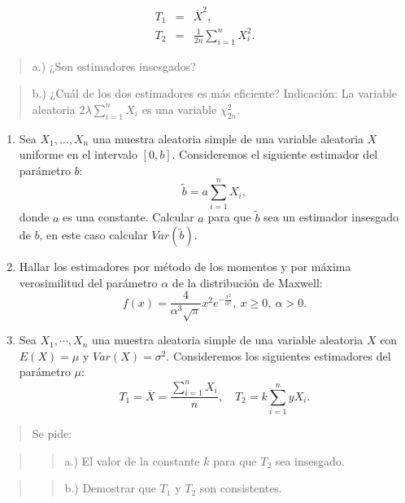 \documentclass[]{article}
\begin{document}
\begin{eqnarray*}
T_1 & = & \overline{X}^2,\\
T_2 & = & \frac{1}{2n}\sum\limits_{i=1}^n X_i^2.
\end{eqnarray*}

\begin{quote}
a.) ¿Son estimadores insesgados?
\end{quote}

\begin{quote}
b.) ¿Cuál de los dos estimadores es más eficiente? Indicación: La
variable aleatoria \(2\lambda \sum\limits_{i=1}^n X_i\) es una variable
\(\chi_{2n}^2\).
\end{quote}

\begin{enumerate}
\def\labelenumi{\arabic{enumi}.}
\setcounter{enumi}{17}
\item
  Sea \(X_1,\ldots,X_n\) una muestra aleatoria simple de una variable
  aleatoria \(X\) uniforme en el intervalo \([0,b]\). Consideremos el
  siguiente estimador del parámetro \(b\): \[
  \tilde{b}=a\sum\limits_{i=1}^n X_i,
  \] donde \(a\) es una constante. Calcular \(a\) para que \(\tilde{b}\)
  sea un estimador insesgado de \(b\), en este caso calcular
  \(Var(\tilde{b})\).
\item
  Hallar los estimadores por método de los momentos y por máxima
  verosimilitud del parámetro \(\alpha\) de la distribución de Maxwell:
  \[
  f(x)=\frac{4}{\alpha^3 \sqrt{\pi}} x^2 
  e^{-\frac{x^2}{\alpha^2}},\ x\geq 0,\ \alpha >0.
  \]
\item
  Sea \(X_1,\cdots,X_n\) una muestra aleatoria simple de una variable
  aleatoria \(X\) con \(E(X)=\mu\) y \(Var(X)=\sigma^2\). Consideremos
  los siguientes estimadores del parámetro \(\mu\): \[
  T_1 = \overline{X}=\frac{\sum\limits_{i=1}^n X_i}{n},\quad
  T_2 = k \sum_{i=1}^n y  X_i.
  \]
\end{enumerate}

\begin{quote}
Se pide:
\end{quote}

\begin{quote}
\begin{quote}
a.) El valor de la constante \(k\) para que \(T_2\) sea insesgado.
\end{quote}
\end{quote}

\begin{quote}
\begin{quote}
b.) Demostrar que \(T_1\) y \(T_2\) son consistentes.
\end{quote}
\end{quote}
\end{document}
